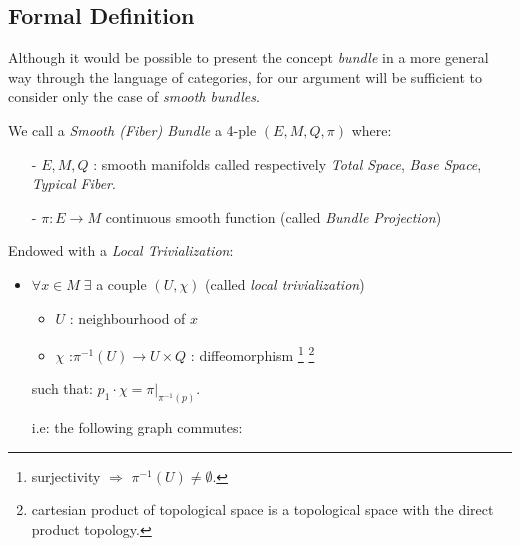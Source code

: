 \documentclass[Main]{subfiles}
\begin{document}
		\subsection{Formal Definition}
			Although it would be possible to present the concept \emph{bundle} in a more general way through the language of categories, for our argument will be sufficient to consider only the case of \emph{smooth bundles}.
			\begin{definition}\label{Def:SmoothBundle}
				We call a \emph{Smooth (Fiber) Bundle}  a 4-ple $(E,M,Q,\pi)$ where:
				\begin{itemize}
					\item[-] $E,M,Q$ :  smooth manifolds called respectively \emph{Total Space}, \emph{Base Space}, \emph{Typical Fiber}.
					\item[-] $\pi : E \rightarrow M $ continuous smooth function (called \emph{Bundle Projection})
				\end{itemize}
				Endowed with a \emph{Local Trivialization}:
				\begin{itemize}
					\item $\forall x \in M \; \exists$ a couple $(U, \chi)$ (called \emph{local trivialization})
					\begin{itemize}
						\item $U$ : neighbourhood of $x$
						\item $\chi$ :$\pi^{-1}(U) \rightarrow U \times Q$ : diffeomorphism
 							\footnote{surjectivity $\Rightarrow$ $\pi^{-1}(U) \neq \emptyset$.} 
 							\footnote{cartesian product of topological space is a topological space with the direct product topology.}
					\end{itemize}
					such that: $p_1 \cdot \chi = \pi \vert_{\pi^{-1}(p)}$.

					i.e: the following graph commutes:

				\end{itemize}
			\end{definition}
\end{document}
